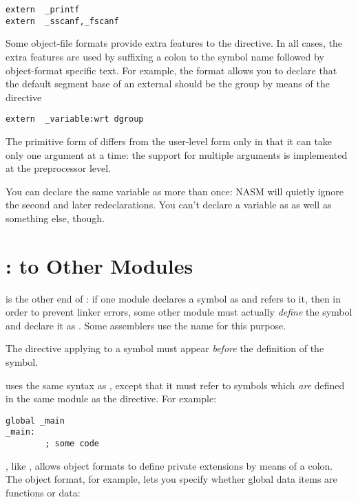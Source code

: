\begin{lstlisting}
extern  _printf
extern  _sscanf,_fscanf
\end{lstlisting}

Some object-file formats provide extra features to the 
directive. In all cases, the extra features are used by suffixing a
colon to the symbol name followed by object-format specific text.
For example, the  format allows you to declare that the
default segment base of an external should be the group 
by means of the directive

\begin{lstlisting}
extern  _variable:wrt dgroup
\end{lstlisting}

The primitive form of  differs from the user-level form
only in that it can take only one argument at a time: the support
for multiple arguments is implemented at the preprocessor level.

You can declare the same variable as  more than once:
NASM will quietly ignore the second and later redeclarations.
You can't declare a variable as  as well as something
else, though.

\section{:  to Other Modules}
\label{sec:global}

 is the other end of : if one module declares a
symbol as  and refers to it, then in order to prevent
linker errors, some other module must actually \emph{define} the
symbol and declare it as . Some assemblers use the name
 for this purpose.

The  directive applying to a symbol must appear \emph{before}
the definition of the symbol.

 uses the same syntax as , except that it must
refer to symbols which \emph{are} defined in the same module as the
 directive. For example:

\begin{lstlisting}
global _main
_main:
        ; some code
\end{lstlisting}

, like , allows object formats to define private
extensions by means of a colon. The  object format, for
example, lets you specify whether global data items are functions or
data:

